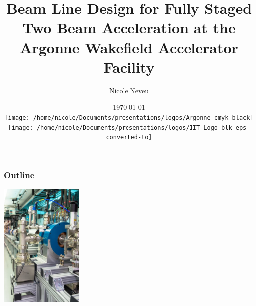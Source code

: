 \documentclass[professionalfonts,t]{beamer}
\title[September 2018]{Beam Line Design for Fully Staged Two Beam Acceleration at the Argonne Wakefield Accelerator Facility }
\author[N.Neveu]{{\Large Nicole Neveu}}
\institute[ANL, IIT] %
{   Illinois Institute of Technology \\
	Argonne National Laboratory \\
    \url{nneveu@anl.gov} 
}
\date{ \today \\
\texttt{[image: /home/nicole/Documents/presentations/logos/Argonne\_cmyk\_black]}%
\hfill \hfill \hfill%
\texttt{[image: /home/nicole/Documents/presentations/logos/IIT\_Logo\_blk-eps-converted-to]}%
}
\begin{document}
\begin{frame}
  \titlepage
\end{frame}

\begin{frame}
	\frametitle{Outline}
	\begin{minipage}{0.6\textwidth}
		\linespread{1.5}	
		\tableofcontents	 
	\end{minipage}\hfill
	\begin{minipage}{0.35\textwidth}
		\includegraphics[width=4cm]{../../tex/images/awa_gun}
	\end{minipage}
\end{frame}
\end{document}
